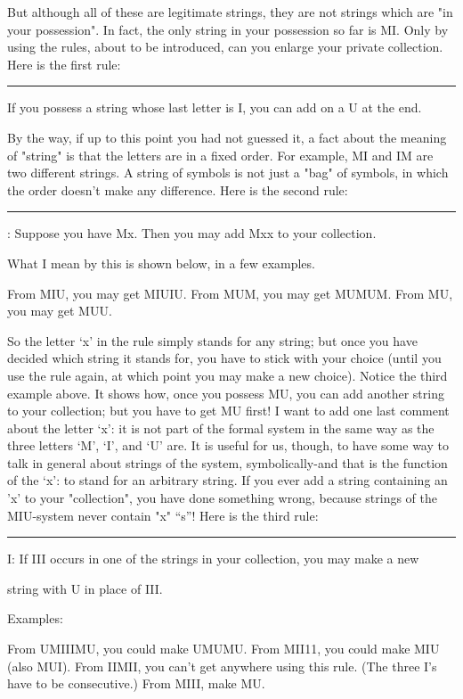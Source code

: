 But although all of these are legitimate strings, they are not strings which are "in your possession". In fact, the only string in your possession so far is MI. Only by using the rules, about to be introduced, can you enlarge your private collection. Here is the first rule: 


\rule I: If you possess a string whose last letter is I, you can add on a U at the end.\par


By the way, if up to this point you had not guessed it, a fact about the meaning of "string" is that the letters are in a fixed order. For example, MI and IM are two different strings. A string of symbols is not just a "bag" of symbols, in which the order doesn't make any difference. Here is the second rule: 


\rule II: Suppose you have Mx. Then you may add Mxx to your collection.\par


What I mean by this is shown below, in a few examples. 

From MIU, you may get MIUIU. From MUM, you may get MUMUM. From MU, you may get MUU. 

So the letter `x' in the rule simply stands for any string; but once you have decided which string it stands for, you have to stick with your choice (until you use the rule again, at which point you may make a new choice). Notice the third example above. It shows how, once you possess MU, you can add another string to your collection; but you have to get MU first! I want to add one last comment about the letter `x': it is not part of the formal system in the same way as the three letters `M', `I', and `U' are. It is useful for us, though, to have some way to talk in general about strings of the system, symbolically-and that is the function of the `x': to stand for an arbitrary string. If you ever add a string containing an 'x' to your "collection", you have done something wrong, because strings of the MIU-system never contain "x" “s”! Here is the third rule: 


\rule III: If III occurs in one of the strings in your collection, you may make a new\par
string with U in place of III. 

Examples: 

From UMIIIMU, you could make UMUMU. From MII11, you could make MIU (also MUI). From IIMII, you can't get anywhere using this rule. 
\intro (The three I's have to be consecutive.) \endintro
From MIII, make MU. 

